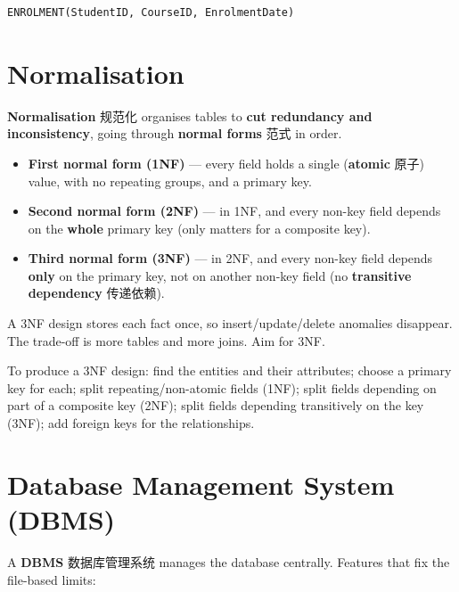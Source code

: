 \documentclass[11pt]{article}
\begin{document}
\begin{Verbatim}
ENROLMENT(StudentID, CourseID, EnrolmentDate)
\end{Verbatim}

\section*{Normalisation}

\textbf{Normalisation} 规范化 organises tables to \textbf{cut redundancy and inconsistency}, going through \textbf{normal forms} 范式 in order.

\begin{itemize}
\item \textbf{First normal form (1NF)} — every field holds a single (\textbf{atomic} 原子) value, with no repeating groups, and a primary key.

\item \textbf{Second normal form (2NF)} — in 1NF, and every non-key field depends on the \textbf{whole} primary key (only matters for a composite key).

\item \textbf{Third normal form (3NF)} — in 2NF, and every non-key field depends \textbf{only} on the primary key, not on another non-key field (no \textbf{transitive dependency} 传递依赖).

\end{itemize}

A 3NF design stores each fact once, so insert/update/delete anomalies disappear. The trade-off is more tables and more joins. Aim for 3NF.

To produce a 3NF design: find the entities and their attributes; choose a primary key for each; split repeating/non-atomic fields (1NF); split fields depending on part of a composite key (2NF); split fields depending transitively on the key (3NF); add foreign keys for the relationships.

\section*{Database Management System (DBMS)}

A \textbf{DBMS} 数据库管理系统 manages the database centrally. Features that fix the file-based limits:
\end{document}
